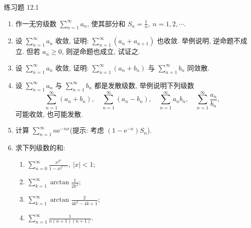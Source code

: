 \begin{exblock}{练习题 12.1}
\begin{enumerate}
\begin{enumerate}
    \item $\displaystyle\sum_{n=1}^{\infty}\ln\frac{n(2n+1)}{(n+1)(2n-1)}=\ln2$;
    \item $\displaystyle\sum_{n=1}^{\infty}\frac{1}{n(n+m)}=\frac{1}{m}\left(1+\frac{1}{2}+\cdots+\frac{1}{m}\right)$, 其中 $m$ 为自然数.
  \end{enumerate}
  \item 作一无穷级数 $\sum_{n=1}^{\infty}a_{n}$, 使其部分和 $S_{n}=\frac{1}{n},\ n=1,2,\cdots$.
  \item 设 $\sum_{n=1}^{\infty}a_{n}$ 收敛, 证明: $\sum_{n=1}^{\infty}(a_{n}+a_{n+1})$ 也收敛. 举例说明, 逆命题不成立. 但若 $a_{n}\geqslant0$, 则逆命题也成立, 试证之.
  \item 设 $\sum_{n=1}^{\infty}a_{n}$ 收敛, 证明: $\sum_{n=1}^{\infty}(a_{n}+b_{n})$ 与 $\sum_{n=1}^{\infty}b_{n}$ 同敛散.
  \item 设 $\sum_{n=1}^{\infty}a_{n}$ 与 $\sum_{n=1}^{\infty}b_{n}$ 都是发散级数, 举例说明下列级数
  \[
    \sum_{n=1}^{\infty}(a_{n}+b_{n}),\quad\sum_{n=1}^{\infty}(a_{n}-b_{n}),\quad\sum_{n=1}^{\infty}a_{n}b_{n},\quad\sum_{n=1}^{\infty}\frac{a_{n}}{b_{n}},
\]
  可能收敛, 也可能发散.
  \item 计算 $\sum_{n=1}^{\infty}n\mathrm{e}^{-nx}$(提示: 考虑 $(1-\mathrm{e}^{-x})S_{n}$).
  \item 求下列级数的和:
  \begin{enumerate}
    \item $\displaystyle\sum_{n=0}^{\infty}\frac{x^{2^{n}}}{1-x^{2^{n+1}}},\ |x|<1$;
    \item $\displaystyle\sum_{k=1}^{\infty}\arctan\frac{1}{2k^{2}}$;
    \item $\displaystyle\sum_{k=1}^{\infty}\arctan\frac{2}{4k^{2}-4k+1}$;
    \item $\displaystyle\sum_{n=1}^{\infty}\frac{1}{n(n+1)(n+1)}$.
  \end{enumerate}
\end{enumerate}
\end{exblock}

